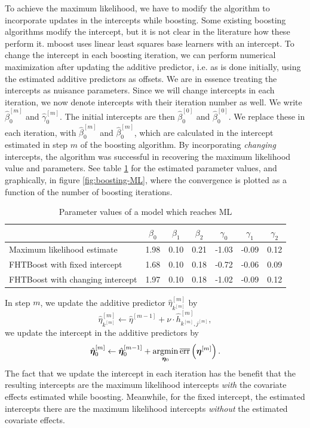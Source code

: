 To achieve the maximum likelihood, we have to modify the algorithm to incorporate updates in the intercepts while boosting.
Some existing boosting algorithms modify the intercept, but it is not clear in the literature how these perform it.
mboost uses linear least squares base learners with an intercept.
To change the intercept in each boosting iteration, we can perform numerical maximization after updating the additive predictor, i.e. as is done initially, using the estimated additive predictors as offsets.
We are in essence treating the intercepts as nuisance parameters.
Since we will change intercepts in each iteration, we now denote intercepts with their iteration number as well.
We write $\hat{\beta}_{0}^{[m]}$ and $\hat{\gamma}_{0}^{[m]}$.
The initial intercepts are then $\hat{\beta}_{0}^{[0]}$ and $\hat{\beta}_{0}^{[0]}$.
We replace these in each iteration, with $\hat{\beta}_{0}^{[m]}$ and $\hat{\beta}_{0}^{[m]}$, which are calculated in the intercept estimated in step $m$ of the boosting algorithm.
By incorporating \textit{changing} intercepts, the algorithm was successful in recovering the maximum likelihood value and parameters.
See table \ref{table:ML} for the estimated parameter values, and graphically, in figure \ref{fig:boosting-ML}, where the convergence is plotted as a function of the number of boosting iterations.
\begin{table}\caption{Parameter values of a model which reaches ML}\label{table:ML}
\centering
\begin{tabular}{lcccccc}
\toprule
    & $\beta_{0}$ & $\beta_{1}$ & $\beta_{2}$ & $\gamma_{0}$ & $\gamma_{1}$ & $\gamma_{2}$ \\
\hline
Maximum likelihood estimate                   &    1.98 &    0.10 &    0.21 &    -1.03 &    -0.09 &     0.12 \\
FHTBoost with fixed intercept                 &    1.68 &    0.10 &    0.18 &    -0.72 &    -0.06 &     0.09 \\
FHTBoost with changing intercept              &    1.97 &    0.10 &    0.18 &    -1.02 &    -0.09 &     0.12 \\
\bottomrule
\end{tabular}
\end{table}
In step $m$, we update the additive predictor $\hat{\eta}^{[m]}_{k^{[m]}}$ by
\begin{equation*}
    \hat{\eta}^{[m]}_{k^{[m]}}\gets\hat{\eta}^{[m-1]}+\nu\cdot\hat{h}_{k^{[m]},j^{[m]}}^{[m]},
\end{equation*}
we update the intercept in the additive predictors by
\begin{equation*}
    \hat{\boldsymbol{\eta}}_0^{[m]}\gets\hat{\boldsymbol{\eta}}_0^{[m-1]}+\operatorname*{argmin}_{\boldsymbol{\eta}_0}\overline{\text{err}}\left(\boldsymbol{\eta}^{[m]}\right).
\end{equation*}
The fact that we update the intercept in each iteration has the benefit that the resulting intercepts are the maximum likelihood intercepts \textit{with} the covariate effects estimated while boosting.
Meanwhile, for the fixed intercept, the estimated intercepts there are the maximum likelihood intercepts \textit{without} the estimated covariate effects.

